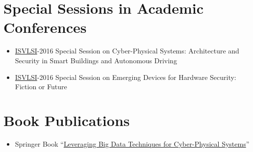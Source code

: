 \section{Special Sessions in Academic Conferences}
\begin{itemize}
    \item
    \href{http://www.isvlsi.org/}{ISVLSI}-2016 Special Session on Cyber-Physical Systems: Architecture and Security in Smart Buildings and Autonomous Driving
    \item
    \href{http://www.isvlsi.org/}{ISVLSI}-2016 Special Session on Emerging Devices for Hardware Security: Fiction or Future
\end{itemize}

\section{Book Publications}
\begin{itemize}
    \item
    Springer Book ``\href{http://www.ieee-cps.org/BOOK-CPSBD.html}{Leveraging Big Data Techniques for Cyber-Physical Systems}''
\end{itemize}


